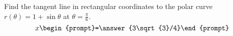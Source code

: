 \documentclass{ximera}
\author{Gregory Hartman \and Matthew Carr}
\begin{document}
\begin{exercise}






Find the tangent line in rectangular coordinates to the polar curve $r(\theta)=1+\sin\theta$ at $\theta=\frac{\pi}{6}$. 
 \[
x\begin{prompt}=\answer{3\sqrt{3}/4}\end{prompt}
 \]      
 
\end{exercise}
\end{document}
